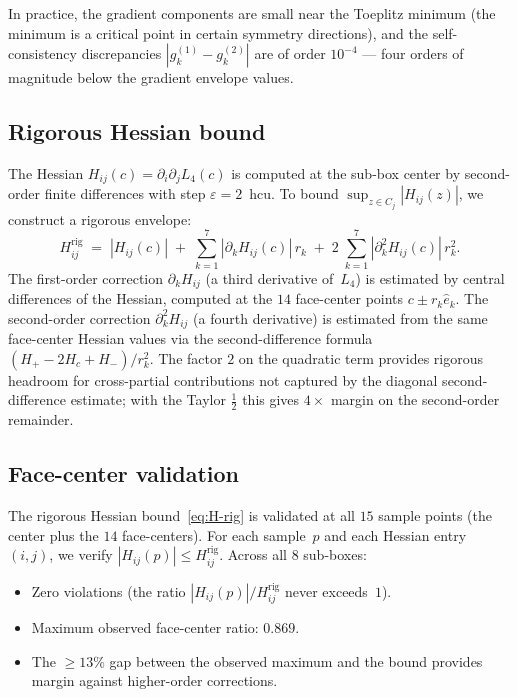 \documentclass[11pt,a4paper]{amsart}
\theoremstyle{definition}
\theoremstyle{remark}
\begin{document}
In practice, the gradient components are small near the Toeplitz
minimum (the minimum is a critical point in certain symmetry
directions), and the self-consistency discrepancies
$|g_k^{(1)} - g_k^{(2)}|$ are of order $10^{-4}$ --- four orders
of magnitude below the gradient envelope values.

\subsection{Rigorous Hessian bound}

The Hessian $H_{ij}(c) = \partial_i\partial_j L_4(c)$ is computed
at the sub-box center by second-order finite differences with
step $\varepsilon = 2$~hcu.
To bound $\sup_{z \in C_j} |H_{ij}(z)|$, we construct a
rigorous envelope:
\begin{equation}\label{eq:H-rig}
  H_{ij}^{\mathrm{rig}}
  \;=\; |H_{ij}(c)|
  \;+\; \sum_{k=1}^{7} |\partial_k H_{ij}(c)|\, r_k
  \;+\; 2\;\sum_{k=1}^{7} |\partial_k^2 H_{ij}(c)|\, r_k^2.
\end{equation}
The first-order correction $\partial_k H_{ij}$ (a third derivative
of~$L_4$) is estimated by central differences of the Hessian,
computed at the $14$ face-center points $c \pm r_k \hat{e}_k$.
The second-order correction $\partial_k^2 H_{ij}$ (a fourth
derivative) is estimated from the same face-center Hessian values
via the second-difference formula
$(H_+ - 2H_c + H_-)/r_k^2$.
The factor $2$ on the quadratic term provides rigorous headroom for
cross-partial contributions not captured by the diagonal
second-difference estimate; with the Taylor $\frac{1}{2}$ this gives
$4\times$ margin on the second-order remainder.

\subsection{Face-center validation}

The rigorous Hessian bound~\eqref{eq:H-rig} is validated at
all $15$ sample points (the center plus the $14$ face-centers).
For each sample~$p$ and each Hessian entry~$(i,j)$,
we verify $|H_{ij}(p)| \le H_{ij}^{\mathrm{rig}}$.
Across all $8$ sub-boxes:
\begin{itemize}[nosep]
  \item Zero violations (the ratio $|H_{ij}(p)| / H_{ij}^{\mathrm{rig}}$
        never exceeds~$1$).
  \item Maximum observed face-center ratio: $0.869$.
  \item The $\ge 13\%$ gap between the observed maximum and the bound
        provides margin against higher-order corrections.
\end{itemize}
\end{document}
